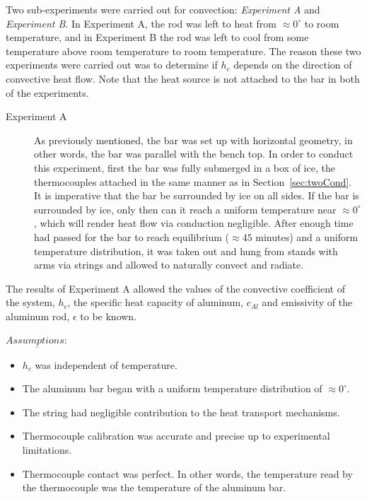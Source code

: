 \documentclass[10pt,aps,prb,twocolumn, nofootinbib]{revtex4-1}
\begin{document}
Two sub-experiments were carried out for convection: \textit{Experiment A} and \textit{Experiment B}. In Experiment A, the rod was left to heat from $\approx 0^\circ$ to room temperature, and in Experiment B the rod was left to cool from some temperature above room temperature to room temperature. The reason these two experiments were carried out was to determine if $h_c$ depends on the direction of convective heat flow. Note that the heat source is not attached to the bar in both of the experiments.

\begin{description}
\item[Experiment A] As previously mentioned, the bar was set up with horizontal geometry, in other words, the bar was parallel with the bench top. In order to conduct this experiment, first the bar was fully submerged in a box of ice, the thermocouples attached in the same manner as in Section~\ref{sec:twoCond}. It is imperative that the bar be surrounded by ice on all sides. If the bar is surrounded by ice, only then can it reach a uniform temperature near $\approx 0^\circ$, which will render heat flow via conduction negligible. After enough time had passed for the bar to reach equilibrium ($\approx 45$ minutes) and a uniform temperature distribution, it was taken out and hung from stands with arms via strings and allowed to naturally convect and radiate. 
\end{description}
The results of Experiment A allowed the values of the convective coefficient of the system, $h_c$, the specific heat capacity of aluminum, $c_{Al}$ and emissivity of the aluminum rod, $\epsilon$ to be known. 

\pagebreak
\bigskip
 \noindent $\underline{Assumptions:}$
 
 \begin{itemize}\parskip0pt
     	\item $h_c$ was independent of temperature.
     	\medskip
     	\item The aluminum bar began with a uniform temperature distribution of $\approx 0^\circ$.
     	\medskip
     	\item The string had negligible contribution to the heat transport mechanisms.
     	\item Thermocouple calibration was accurate and precise up to experimental limitations.
     	\medskip
     	\item Thermocouple contact was perfect. In other words, the temperature read by the thermocouple was the temperature of the aluminum bar.
 \end{itemize} 
\end{document}
